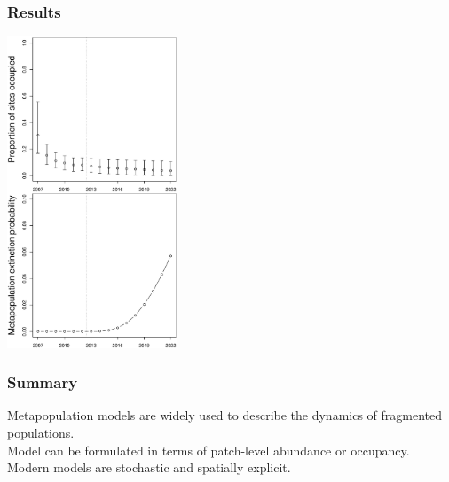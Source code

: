 \documentclass[color=usenames,dvipsnames]{beamer}\usepackage[]{graphicx}\usepackage[]{xcolor}
\begin{document}
\begin{frame}[fragile]
\end{frame}



\begin{frame}
  \frametitle{Results}
  \begin{center}
    \includegraphics[width=0.38\textwidth]{figs/proj-ext2} \\
  \end{center}
\end{frame}




\begin{frame}
  \frametitle{Summary}
  \large
  Metapopulation models are widely used to describe the
      dynamics of fragmented populations. \\
  \vfill
  Model can be formulated in terms of patch-level abundance
      or occupancy. \\
  \vfill
  Modern models are stochastic and spatially explicit.
\end{frame}
\end{document}

